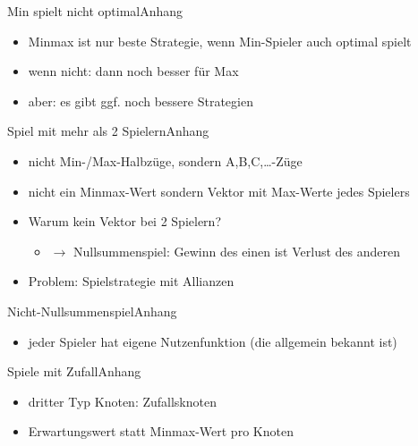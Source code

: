 \documentclass[18pt, aspectratio=169]{beamer}
\begin{document}
\begin{frame}{Min spielt nicht optimal}{Anhang}
  \begin{itemize}
  \item
    Minmax ist nur beste Strategie, wenn Min-Spieler auch optimal spielt
  \item
    wenn nicht: dann noch besser für Max
  \item
    aber: es gibt ggf. noch bessere Strategien
  \end{itemize}
\end{frame}

\begin{frame}{Spiel mit mehr als 2 Spielern}{Anhang}
  \begin{itemize}
  \item
    nicht Min-/Max-Halbzüge, sondern A,B,C,\dots-Züge
  \item
    nicht ein Minmax-Wert sondern Vektor mit Max-Werte jedes Spielers
  \item
    Warum kein Vektor bei 2 Spielern?
    \begin{itemize}
    \item
      $\rightarrow$ Nullsummenspiel: Gewinn des einen ist Verlust des anderen
    \end{itemize}
  \item
    Problem: Spielstrategie mit Allianzen
  \end{itemize}
\end{frame}

\begin{frame}{Nicht-Nullsummenspiel}{Anhang}
  \begin{itemize}
  \item
    jeder Spieler hat eigene Nutzenfunktion (die allgemein bekannt ist)
  \end{itemize}
\end{frame}


\begin{frame}{Spiele mit Zufall}{Anhang}
  \begin{itemize}
  \item
    dritter Typ Knoten: Zufallsknoten
  \item
    Erwartungswert statt Minmax-Wert pro Knoten
  \end{itemize}
\end{frame}
\end{document}
